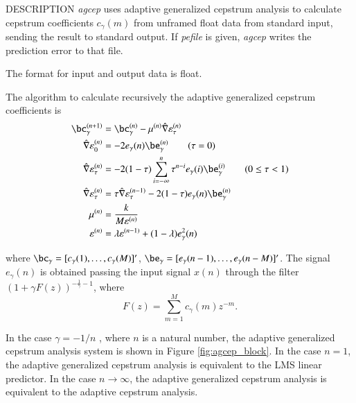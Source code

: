 \begin{qsection}{DESCRIPTION}
	{\em agcep} uses adaptive generalized cepstrum analysis
	\cite{ref:agcep-IEICEtaikai90s}
	to calculate cepstrum coefficients $c_\gamma(m)$ 
	from unframed float data from standard input,
	sending the result to standard output. 
	If {\em pefile} is given, 
	{\em agcep} writes the prediction error to that file.

	The format for input and output data is float.

	The algorithm to calculate recursively the
        adaptive generalized cepstrum coefficients is 
\begin{align}
  \bc_\gamma^{(n+1)} &= \bc_\gamma^{(n)} 
     - \mu^{(n)} \hat{\nabla} \varepsilon_{\tau}^{(n)} \notag \\
  \hat{\nabla} \varepsilon_{0}^{(n)} &= -2 e_\gamma (n) \be_\gamma^{(n)}
  \qquad ( \tau = 0 ) \notag \\
  \hat{\nabla} \varepsilon_{\tau}^{(n)} &= -2 (1 - \tau) \sum_{i=-\infty}^{n}
  \tau^{n-i} e_\gamma (i) \be_\gamma^{(i)} \qquad ( 0 \le \tau < 1 ) \notag \\
  \hat{\nabla} \varepsilon_{\tau}^{(n)} &= \tau \hat{\nabla}  
  \varepsilon_{\tau}^{(n-1)} - 2 (1 - \tau) e_\gamma (n) \be_\gamma^{(n)}
  \notag \\
  \mu^{(n)} &= \frac{k}{M \varepsilon^{(n)}} \notag \\
  \varepsilon^{(n)} &= \lambda \varepsilon^{(n-1)}
     + (1-\lambda)e_\gamma^2(n) \notag
\end{align}	

where
$\bc_\gamma = [c_\gamma(1),\ldots,c_\gamma(M)]'$,
$\be_\gamma = [e_\gamma(n-1),\ldots,e_\gamma(n-M)]'$.
The signal $e_\gamma(n)$ is obtained passing the input signal
 $x(n)$ through the filter $(1+\gamma F(z))^{-\frac{1}{\gamma}-1}$,
where 
\begin{displaymath}
F(z) = \sum_{m=1}^{M}c_\gamma(m)z^{-m}.
\end{displaymath}
\par
In the case $\gamma = -1/n$ , where $n$ is a natural number,
the adaptive generalized cepstrum analysis system is shown in 
Figure \ref{fig:agcep_block}.
In the case $n=1$, the adaptive generalized cepstrum
analysis is equivalent to the LMS linear predictor.
In the case $n \rightarrow \infty$,
the adaptive generalized cepstrum
analysis is equivalent to the 
adaptive cepstrum analysis.


\end{qsection}
